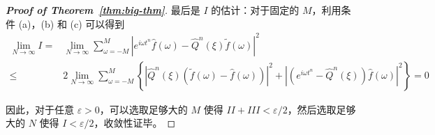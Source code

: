 \begin{proof}[\normalfont\bfseries Proof of Theorem~\ref{thm:big-thm}]
    最后是 $I$ 的估计：对于固定的 $M$，利用条件 (a)，(b) 和 (c) 可以得到
    \begin{align*}
        \lim_{N \to \infty} I ={} & \lim_{N \to \infty} \sum_{\omega = -M}^{M} \left| e^{i \omega t^n} \hat{f}(\omega ) - \widehat{Q}^n(\xi) \tilde{f}(\omega ) \right|^2 \\
        \le{}                     & 2 \lim_{N \to \infty} \sum_{\omega = -M}^{M}
        \left\{
        \left| \widehat{Q}^n(\xi) \left(\tilde{f}(\omega) - \hat{f}(\omega) \right) \right|^2
        + \left| \left(e^{i \omega t^n}  - \widehat{Q}^n(\xi)\right) \hat{f}(\omega ) \right|^2
        \right\} = 0
    \end{align*}

    因此，对于任意 $\varepsilon > 0$，可以选取足够大的 $M$ 使得 $I\!I + I\!I\!I < \varepsilon/2$，然后选取足够大的 $N$ 使得 $I < \varepsilon/2$，收敛性证毕。
\end{proof}
